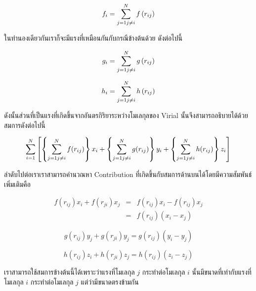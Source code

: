 \begin{equation}
    f_i = \sum_{j=1 \\ j\neq i}^{N} f\left( r_{ij}\right)
\end{equation}

\noindent ในทำนองเดียวกันเราก็จะมีแรงที่เหมือนกันกับกรณีข้างต้นด้วย ดังต่อไปนี้

\begin{equation}
    g_i = \sum_{j=1 \\ j\neq i}^{N} g\left( r_{ij}\right)
\end{equation}

\begin{equation}
    h_i = \sum_{j=1 \\ j\neq i}^{N} h\left( r_{ij}\right)
\end{equation}

ดังนั้นส่วนที่เป็นแรงที่เกิดขึ้นจากอันตรกิริยาระหว่างโมเลกุลของ Virial นั้นจึงสามารถอธิบายได้ด้วยสมการดังต่อไปนี้

\begin{equation}
    \sum_{i=1}^{N} \left[ \left\{ \sum_{j=1 \\ j\neq i}^{N} f(r_{ij})\right\}
        x_i+\left\{ \sum_{j=1 \\ j\neq i}^{N} g(r_{ij})\right\} y_i+\left\{
        \sum_{j=1 \\ j\neq i}^{N} h(r_{ij})\right\} z_i\right]
\end{equation}

ลำดับไปต่อเราเราสามารถคำนวณหา Contribution ที่เกิดขึ้นกับสมการด้านบนได้โดยมีความสัมพันธ์เพิ่มเติมคือ

\begin{eqnarray}
    f\left(r_{ij}\right) x_i+f\left( r_{ji}\right) x_j & = &f\left( r_{ij}\right)
    x_i-f\left( r_{ij}\right) x_j \\
    & = &f\left( r_{ij}\right) \left( x_i-x_j\right)
\end{eqnarray}

\begin{equation}
    g\left(r_{ij}\right) y_j+g\left( r_{ji}\right) y_j=g\left( r_{ij}\right)
    \left(y_i-y_j\right)
\end{equation}

\begin{equation}
    h\left(r_{ij}\right) z_i+h\left( r_{ji}\right) z_j=h\left( r_{ij}\right)
    \left(z_i-z_j\right)
\end{equation}

เราสามารถใช้สมการข้างต้นนี้ได้เพราะว่าแรงที่โมเลกุล $j$ กระทำต่อโมเลกุล $i$ นั้นมีขนาดที่เท่ากับแรงที่โมเลกุล $i$ กระทำต่อโมเลกุล $j$
แต่ว่ามีขนาดตรงข้ามกัน

